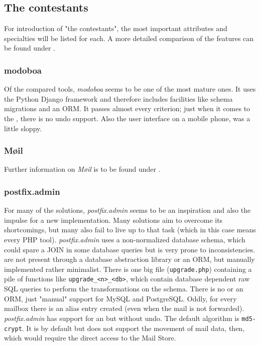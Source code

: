 \documentclass[12pt,a4paper]{scrartcl}
\begin{document}
		\subsection{The contestants}
			For introduction of "the contestants", the most important
			attributes and specialties will be listed for each. A more detailed
			comparison of the features can be found under
			.

			\subsubsection{modoboa}

				Of the compared tools, \emph{modoboa} seems to be one of the
				most mature ones. It uses the Python Django framework and
				therefore includes facilities like schema migrations and an
				\ac{ORM}. It passes almost every criterion; just when it comes
				to the , there is no undo support.
				Also the user interface on a mobile phone, was a little sloppy.

			\subsubsection{Møil}
				
				Further information on \emph{Møil} is to be found under
				.

			\subsubsection{postfix.admin}
			\label{sec:contestants:postfix.admin}

				For many of the solutions, \emph{postfix.admin} seems to be an
				inspiration and also the impulse for a new implementation. Many
				solutions aim to overcome its shortcomings, but many also fail
				to live up to that task (which in this case means every PHP
				tool). \emph{postfix.admin} uses a non-normalized \cite{dbnorm}
				database schema, which could spare a JOIN in some database
				queries but is very prone to inconsistencies.  are not present through a database abstraction
				library or an \ac{ORM}, but manually implemented rather
				minimalist. There is one big file (\texttt{upgrade.php})
				containing a pile of functions like
				\texttt{upgrade\_<n>\_<db>}, which contain database dependent
				raw \ac{SQL} queries to perform the transformations on the
				schema. There is no  or an \ac{ORM}, just "manual" support for
				MySQL and PostgreSQL. Oddly, for every mailbox there is an
				alias entry created (even when the mail is not forwarded).
				\emph{postfix.admin} has support for an  but without undo. The default  algorithm is \texttt{md5-crypt}. It is
				 by default but does not support the
				movement of mail data, then, which would require the direct
				access to the Mail Store.
\end{document}
